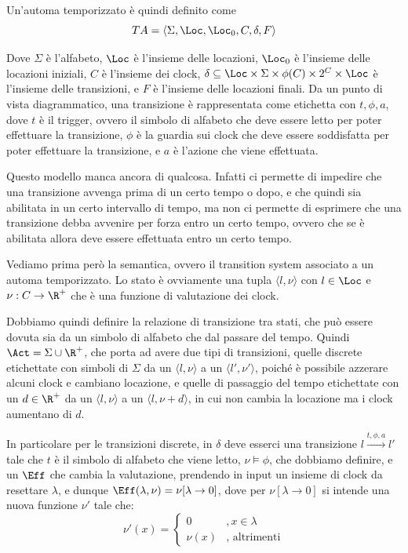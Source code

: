 Un'automa temporizzato è quindi definito come
\[TA = \langle\Sigma, \Loc, \Loc_0,C,\delta,F\rangle\]

Dove \(\Sigma\) è l'alfabeto, \(\Loc\) è l'insieme delle locazioni, \(\Loc_0\) è l'insieme delle locazioni iniziali, \(C\) è l'insieme dei clock, \(\delta \subseteq \Loc \times \Sigma \times \phi(C) \times 2^C \times \Loc\) è l'insieme delle transizioni, e \(F\) è l'insieme delle locazioni finali. Da un punto di vista diagrammatico, una transizione è rappresentata come etichetta con \(t, \phi, a\), dove \(t\) è il trigger, ovvero il simbolo di alfabeto che deve essere letto per poter effettuare la transizione, \(\phi\) è la guardia sui clock che deve essere soddisfatta per poter effettuare la transizione, e \(a\) è l'azione che viene effettuata.


Questo modello manca ancora di qualcosa. Infatti ci permette di impedire che una transizione avvenga prima di un certo tempo o dopo, e che quindi sia abilitata in un certo intervallo di tempo, ma non ci permette di esprimere che una transizione debba avvenire per forza entro un certo tempo, ovvero che se è abilitata allora deve essere effettuata entro un certo tempo.

Vediamo prima però la semantica, ovvero il transition system associato a un automa temporizzato.
Lo stato è ovviamente una tupla \(\langle l, \nu\rangle\) con \(l \in \Loc\) e \(\nu: C \to \R^+\) che è una funzione di valutazione dei clock.

Dobbiamo quindi definire la relazione di transizione tra stati, che può essere dovuta sia da un simbolo di alfabeto che dal passare del tempo. Quindi \(\Act = \Sigma \cup \R^+\), che porta ad avere due tipi di transizioni, quelle discrete etichettate con simboli di \(\Sigma\) da un \(\langle l,\nu \rangle\) a un \(\langle l',\nu' \rangle\), poiché è possibile azzerare alcuni clock e cambiano locazione, e quelle di passaggio del tempo etichettate con un \(d \in \R^+\) da un \(\langle l,\nu \rangle\) a un \(\langle l,\nu + d\rangle\), in cui non cambia la locazione ma i clock aumentano di \(d\).

In particolare per le transizioni discrete, in \(\delta\) deve esserci una transizione \(l \xrightarrow{t, \phi, a} l'\) tale che \(t\) è il simbolo di alfabeto che viene letto, \(\nu\models\phi\), che dobbiamo definire, e un \(\Eff\) che cambia la valutazione, prendendo in input un insieme di clock da resettare \(\lambda\), e dunque \(\Eff(\lambda, \nu) = \nu[\lambda \to 0]\), dove per \(\nu[\lambda \to 0]\) si intende una nuova funzione \(\nu'\) tale che:
\[\nu'(x) = \begin{cases}
    0      & ,x \in \lambda      \\
    \nu(x) & ,\text{ altrimenti}
  \end{cases}\]


